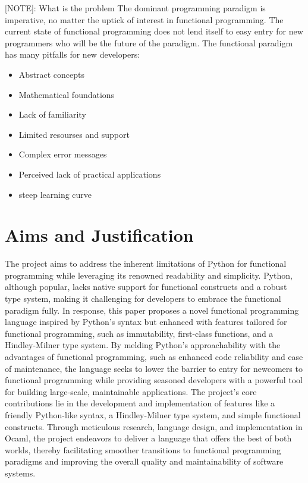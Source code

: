 \documentclass{l4proj}
\begin{document}
[NOTE]: What is the problem
The dominant programming paradigm is imperative, no matter the uptick of interest in functional programming.
The current state of functional programming does not lend itself to easy entry for new programmers who will be the future of the paradigm.
The functional paradigm has many pitfalls for new developers:
\begin{itemize}
    \item Abstract concepts
    \item Mathematical foundations
    \item Lack of familiarity
    \item Limited resourses and support
    \item Complex error messages
    \item Perceived lack of practical applications
    \item steep learning curve
\end{itemize}

\section{Aims and Justification}

The project aims to address the inherent limitations of Python for functional programming while leveraging its renowned readability and simplicity.
Python, although popular, lacks native support for functional constructs and a robust type system, making it challenging for developers to embrace the functional paradigm fully.
In response, this paper proposes a novel functional programming language inspired by Python's syntax but enhanced with features tailored for functional programming, such as immutability, first-class functions, and a Hindley-Milner type system.
By melding Python's approachability with the advantages of functional programming, such as enhanced code reliability and ease of maintenance, the language seeks to lower the barrier to entry for newcomers to functional programming while providing seasoned developers with a powerful tool for building large-scale, maintainable applications.
The project's core contributions lie in the development and implementation of features like a friendly Python-like syntax, a Hindley-Milner type system, and simple functional constructs.
Through meticulous research, language design, and implementation in Ocaml, the project endeavors to deliver a language that offers the best of both worlds, thereby facilitating smoother transitions to functional programming paradigms and improving the overall quality and maintainability of software systems.
\end{document}
